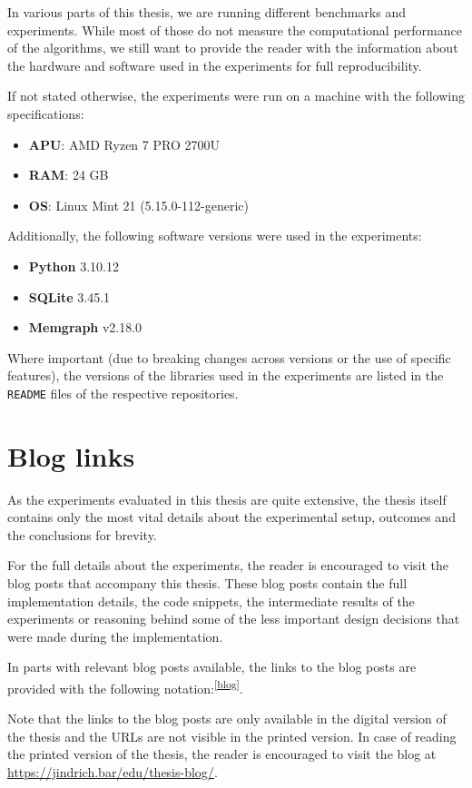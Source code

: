 In various parts of this thesis, we are running different benchmarks and experiments.
While most of those do not measure the computational performance of the algorithms, we still want to 
provide the reader with the information about the hardware and software used in the experiments for full reproducibility.

If not stated otherwise, the experiments were run on a machine with the following specifications:
\begin{itemize}
    \item \textbf{APU}: AMD Ryzen 7 PRO 2700U
    \item \textbf{RAM}: 24 GB
    \item \textbf{OS}: Linux Mint 21 (5.15.0-112-generic)
\end{itemize}

Additionally, the following software versions were used in the experiments:

\begin{itemize}
    \item \textbf{Python} 3.10.12
    \item \textbf{SQLite} 3.45.1
    \item \textbf{Memgraph} v2.18.0
\end{itemize}

Where important (due to breaking changes across versions or the use of specific features), 
the versions of the libraries used in the experiments are listed in the \texttt{README} files of the respective repositories.

\section*{Blog links}
As the experiments evaluated in this thesis are quite extensive, 
the thesis itself contains only the most vital details about the experimental setup, outcomes and the conclusions for brevity.

For the full details about the experiments, the reader is encouraged to visit the blog posts that accompany this thesis.
These blog posts contain the full implementation details, the code snippets, the intermediate results of the experiments
or reasoning behind some of the less important design decisions that were made during the implementation.

In parts with relevant blog posts available, the links to the blog posts are provided with the following notation:\textsuperscript{\href{https://barjin.github.io/edu/thesis-blog/}{[blog]}}.

Note that the links to the blog posts are only available in the digital version of the thesis and the URLs are not visible in the printed version.
In case of reading the printed version of the thesis, the reader is encouraged to visit the blog at \url{https://jindrich.bar/edu/thesis-blog/}.